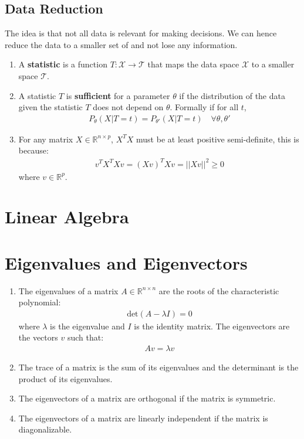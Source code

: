 \documentclass[letterpaper, 11pt]{article}
\let\mc\mathcal
\newcommand{\R}{\mathbb{R}}	%
\newcommand{\1}{\mathds{1}}	%
\theoremstyle{definition}
\begin{document}
\subsection{Data Reduction}
The idea is that not all data is relevant for making decisions. We can hence 
reduce the data to a smaller set of and not lose any information. 
\begin{enumerate}
    \item A \textbf{statistic} is a function $T : \mc{X} \to \mc{T}$ that maps the data space $\mc{X}$ to a smaller space $\mc{T}$.
    \item A statistic $T$ is \textbf{sufficient} for a parameter $\theta$ if the distribution of the data given the statistic $T$ does not depend on $\theta$. 
    Formally if for all $t$, 
    \begin{align}
        P_{\theta}(X | T = t) = P_{\theta'}(X | T = t) \quad \forall \theta, \theta'
    \end{align}
    \item For any matrix $X \in \R^{n \times p}$, $X^T X$ must be at least positive semi-definite, this is because:
    \begin{align}
        v^T X^T X v = (Xv)^T Xv = ||Xv||^2 \geq 0
    \end{align}
    where $v \in \R^p$.

\end{enumerate}

\section{Linear Algebra}

\section{Eigenvalues and Eigenvectors}
\begin{enumerate}
    \item The eigenvalues of a matrix $A \in \R^{n \times n}$ are the roots of the characteristic polynomial:
    \begin{align}
        \text{det}(A - \lambda I) = 0
    \end{align}
    where $\lambda$ is the eigenvalue and $I$ is the identity matrix. The eigenvectors are the vectors $v$ such that:
    \begin{align}
        A v = \lambda v
    \end{align}
    \item The trace of a matrix is the sum of its eigenvalues and the determinant is the product of its eigenvalues.
    \item The eigenvectors of a matrix are orthogonal if the matrix is symmetric.
    \item The eigenvectors of a matrix are linearly independent if the matrix is diagonalizable.
\end{enumerate}
\end{document}
